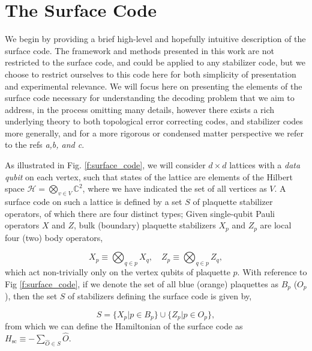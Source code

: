 \documentclass[onecolumn,preprintnumbers,amsmath,amssymb,notitlepage,nofootinbib,longbibliography,superscriptaddress]{revtex4-1}
\begin{document}
\section{The Surface Code}\label{s:the_surface_code}


    We begin by providing a brief high-level and hopefully intuitive description of the surface code. The framework and methods presented in this work are not restricted to the surface code, and could be applied to any stabilizer code, but we choose to restrict ourselves to this code here for both simplicity of presentation and experimental relevance. We will focus here on presenting the elements of the surface code necessary for understanding the decoding problem that we aim to address, in the process omitting many details, however there exists a rich underlying theory to both topological error correcting codes, and stabilizer codes more generally, and for a more rigorous or condensed matter perspective we refer to the refs \textit{a,b, and c}.

    As illustrated in Fig. \ref{f:surface_code}, we will consider $d\times d$ lattices with a \textit{data qubit} on each vertex, such that states of the lattice are elements of the Hilbert space $\mathcal{H} = \bigotimes_{v \in V}\mathbb{C}^2$, where we have indicated the set of all vertices as $V$. A surface code on such a lattice is defined by a set $S$ of plaquette stabilizer operators, of which there are four distinct types; Given single-qubit Pauli operators $X$ and $Z$, bulk (boundary) plaquette stabilizers $X_{p}$ and $Z_{p}$ are local four (two) body operators,

    \begin{equation}
        X_{p} \equiv \bigotimes_{q \in p} X_q, \quad Z_{p} \equiv \bigotimes_{q \in p} Z_q,
    \end{equation}
    which act non-trivially only on the vertex qubits of plaquette $p$. With reference to Fig \ref{f:surface_code}, if we denote the set of all blue (orange) plaquettes as $B_p$ ($O_p$), then the set $S$ of stabilizers defining the surface code is given by,

    \begin{equation}
        S = \big\{ X_p \vert p \in B_p  \big\} \cup \big\{ Z_p \vert p \in O_p  \big\},
    \end{equation}
    from which we can define the Hamiltonian of the surface code as $H_{\mathrm{sc}} \equiv -\sum_{\hat{O} \in S}\hat{O}$. 
\end{document}
